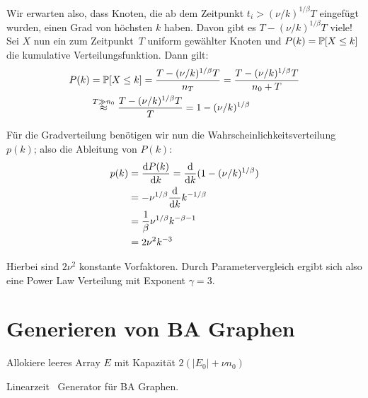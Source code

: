 Wir erwarten also, dass Knoten, die ab dem Zeitpunkt $t_i > (\nu / k)^{1/\beta} T$ eingefügt wurden, einen Grad von höchsten $k$ haben.
Davon gibt es $T - (\nu / k)^{1/\beta} T$ viele!
Sei $X$ nun ein zum Zeitpunkt~$T$ uniform gewählter Knoten und $P(k) = \mathbb{P}\!\left[X \le k\right]$ die kumulative Verteilungsfunktion.
Dann gilt:
\begin{align}
    P(k) & = \mathbb{P}\!\left[X \le k\right] = \frac{T - (\nu / k)^{1/\beta} T}{n_T} = \frac{T - (\nu / k)^{1/\beta} T}{n_0 + T} \\
         & \stackrel{T \gg n_0}{\approx} \frac{T - (\nu / k)^{1/\beta} T}{T} = 1 - (\nu / k)^{1/\beta}
\end{align}

Für die Gradverteilung benötigen wir nun die Wahrscheinlichkeitsverteilung $p(k)$; also die Ableitung von $P(k)$:
\begin{align}
    p(k) & = \frac{\text d P(k)}{\text d k} = \frac{\text d}{\text d k} (1 - (\nu / k)^{1/\beta}) \\
         & = - \nu ^ {1/\beta}  \frac{\text d}{\text d k} k ^{-1/\beta}                       \\
         & = \frac{1}{\beta} \nu ^{1 / \beta} k^{-\beta - 1}                              \\
         & = 2 \nu^2 k^{-3}
\end{align}

Hierbei sind $2 \nu^2$ konstante Vorfaktoren.
Durch Parametervergleich ergibt sich also eine Power Law Verteilung mit Exponent $\gamma = 3$.

\section{Generieren von BA Graphen}
\begin{algorithm}[t]

    Allokiere leeres Array $E$ mit Kapazität $2(|E_0| + \nu n_0)$\;


    \caption{Linearzeit~\cite{batagelj2005efficient} Generator für BA Graphen.}
    \label{alg:bb_ba}
    \vspace{1em}
\end{algorithm}


